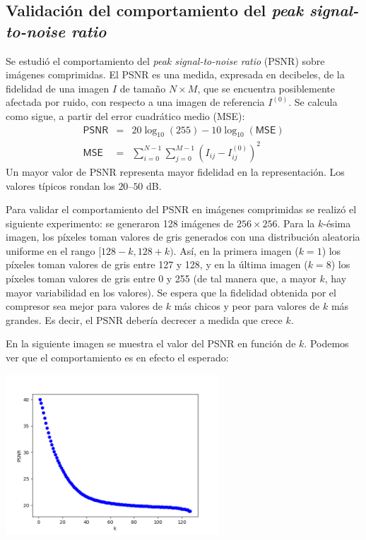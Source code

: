 \documentclass{article}
\begin{document}
\subsection{Validación del comportamiento del {\em peak signal-to-noise ratio}}

Se estudió el comportamiento del
{\em peak signal-to-noise ratio} (PSNR) sobre imágenes
comprimidas.
El PSNR es una medida, expresada en decibeles,
de la fidelidad de una imagen $I$ de tamaño $N \times M$,
que se encuentra posiblemente afectada por ruido,
con respecto a una imagen de referencia $I^{(0)}$.
Se calcula como sigue, a partir del error cuadrático medio (MSE):
\[
  \begin{array}{rcl}
    \mathsf{PSNR} & = & 20 \log_{10}(255) - 10 \log_{10}(\mathsf{MSE}) \\
    \mathsf{MSE} & = & \sum_{i=0}^{N-1} \sum_{j=0}^{M-1} (I_{ij} - I^{(0)}_{ij})^2
  \end{array}
\]
Un mayor valor de PSNR representa mayor fidelidad en la representación.
Los valores típicos rondan los $20$--$50$ dB.
\bigskip

Para validar el comportamiento del PSNR en imágenes comprimidas
se realizó el siguiente experimento:
se generaron 128 imágenes de $256 \times 256$.
Para la $k$-ésima imagen, los píxeles toman valores de gris
generados con una distribución aleatoria uniforme
en el rango $[128 - k, 128 + k)$.
Así, en la primera imagen ($k = 1$)
los píxeles
toman valores de gris entre 127 y 128,
y en la última imagen ($k = 8$)
los píxeles
toman valores de gris entre 0 y 255
(de tal manera que, a mayor $k$, hay mayor variabilidad
en los valores).
Se espera que la fidelidad obtenida por el compresor
sea mejor para valores de $k$ más chicos y peor para valores
de $k$ más grandes. Es decir, el PSNR debería decrecer a
medida que crece $k$.

En la siguiente imagen se muestra el valor del PSNR en función
de $k$. Podemos ver que el comportamiento es en efecto el esperado:

\begin{center}
\includegraphics[width=8cm]{../imgs/output/test_psnr/k_vs_psnr.png}
\end{center}
\end{document}
